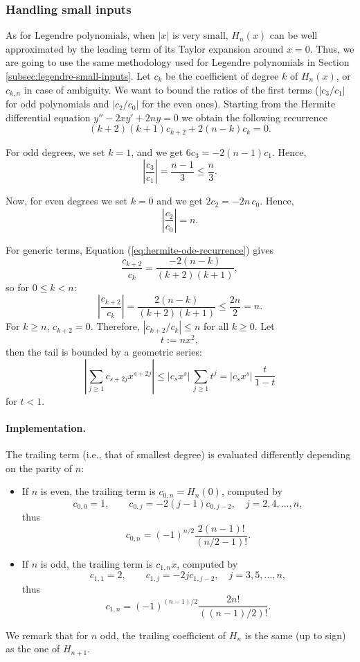 \documentclass[12pt]{amsart}
\begin{document}
\subsubsection{Handling small inputs}

As for Legendre polynomials, when $|x|$ is very small, $H_n(x)$ can be well
approximated by the leading term of its Taylor expansion around $x=0$. Thus,
we are going to use the same methodology used for Legendre polynomials in Section
\ref{subsec:legendre-small-inputs}.
Let $c_k$ be the coefficient of degree $k$ of $H_n(x)$,
or $c_{k,n}$ in case of ambiguity.
We want to bound the ratios of the first terms
($|c_3/c_1|$ for odd polynomials and $|c_2/c_0|$ for the even ones). Starting
from the Hermite differential equation $y'' - 2x y' + 2ny = 0$ we obtain the
following recurrence
\begin{equation} \label{eq:hermite-ode-recurrence}
  (k+2)(k+1)c_{k+2}
  + 2 (n - k) c_k = 0.
\end{equation}

For odd degrees, we set $k = 1$, and we get $6c_3 = -2(n-1)c_1$. Hence,
\[
  \left|\frac{c_3}{c_1}\right| = \frac{n-1}{3} \le \frac{n}{3}.
\]

Now, for even degrees we set $k = 0$ and we get $2c_2 = -2n\,c_0$. Hence,
\[
  \left|\frac{c_2}{c_0}\right| = n.
\]

For generic terms, Equation (\ref{eq:hermite-ode-recurrence}) gives
\[
  \frac{c_{k+2}}{c_k} = \frac{-2(n-k)}{(k+2)(k+1)},
\]
so for $0 \le k < n$:
\[
  \left|\frac{c_{k+2}}{c_k}\right|
  =
  \frac{2(n-k)}{(k+2)(k+1)}
  \le \frac{2n}{2} = n.
\]
For $k \ge n$, $c_{k+2} = 0$. Therefore, $|c_{k+2}/c_k| \le n$ for all $k \ge 0$.
Let
\[
  t := nx^2,
\]
then the tail is bounded by a geometric series:
\[
  \left|\sum_{j \ge 1} c_{s+2j}x^{s+2j}\right|
  \le |c_s x^s|\,\sum_{j \ge 1} t^j
  = |c_s x^s|\,\frac{t}{1-t}
\]
for $t < 1$.

\paragraph{\textbf{Implementation.}} The trailing term (i.e., that of smallest
degree) is evaluated differently
depending on the parity of $n$:
\begin{itemize}
\item If $n$ is even, the trailing term is $c_{0,n} = H_n(0)$, computed by
  \[
    c_{0,0}=1, \qquad c_{0,j}=-2(j-1)c_{0,j-2},
    \quad j = 2, 4, ..., n,
  \]
  thus
  \[
    c_{0,n} = (-1)^{n/2} \frac{2 (n-1)!}{(n/2-1)!}.
  \]

\item If $n$ is odd, the trailing term is $c_{1,n} x$, computed by
  \[
    c_{1,1}=2, \qquad c_{1,j}=-2jc_{1,j-2},
    \quad j = 3, 5, ..., n,
  \]
  thus
  \[
    c_{1,n} = (-1)^{(n-1)/2} \frac{2 n!}{((n-1)/2)!}.
  \]
\end{itemize}
We remark that for $n$ odd, the trailing coefficient of $H_n$
is the same (up to sign) as the one of $H_{n+1}$.
\end{document}

